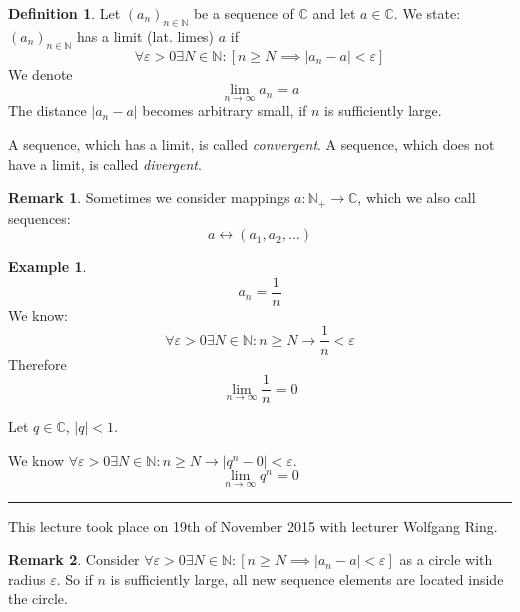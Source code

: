 \documentclass[a4paper,landscape,twocolumn]{article}
\theoremstyle{definition}
\newtheorem{defi}{Definition}
\newtheorem{rem}{Remark}
\newtheorem{ex}{Example}
\newcommand\abs[1]{\left|#1\right|}
\newcommand\seq[1]{{\left(#1\right)}_{n \in \mathbb N}}
\newcommand\meta[3]{\hrule{} This #1 took place on #2 with lecturer #3.\par}
\begin{document}
\begin{defi}
  Let $\seq{a_n}$ be a sequence of $\mathbb C$ and let $a \in \mathbb C$.
  We state: $(a_n)_{n \in \mathbb N}$ has a limit (lat. limes) $a$ if
  \[ \forall \varepsilon > 0 \exists N \in \mathbb N: \left[n \geq N \implies \abs{a_n - a} < \varepsilon\right] \]
  We denote
  \[ \lim_{n \to \infty} a_n = a \]
  The distance $\abs{a_n - a}$ becomes arbitrary small, if $n$ is sufficiently large.

  A sequence, which has a limit, is called \emph{convergent}. A sequence, which does not have a limit, is called \emph{divergent}.
\end{defi}

\begin{rem}
  Sometimes we consider mappings $a: \mathbb N_+ \rightarrow \mathbb C$, which we also call sequences:
  \[ a \leftrightarrow (a_1, a_2, \ldots) \]
\end{rem}

\begin{ex}
  \[ a_n = \frac1n \]
  We know:
  \[ \forall \varepsilon > 0 \exists N \in \mathbb N: n \geq N \rightarrow \frac1n < \varepsilon \]
  Therefore
  \[ \lim_{n \to \infty} \frac1n = 0 \]
\end{ex}

Let $q \in \mathbb C$, $\abs{q} < 1$.

We know $\forall \varepsilon > 0 \exists N \in \mathbb N: n \geq N \rightarrow \abs{q^n - 0} < \varepsilon$.
\[ \lim_{n\to\infty} q^n = 0 \]

\meta{lecture}{19th of November 2015}{Wolfgang Ring}

\begin{rem}
  Consider $\forall \varepsilon > 0 \exists N \in \mathbb N: \left[n \geq N \implies \abs{a_n - a} < \varepsilon\right]$
  as a circle with radius $\varepsilon$. So if $n$ is sufficiently large,
  all new sequence elements are located inside the circle.
\end{rem}
\end{document}
